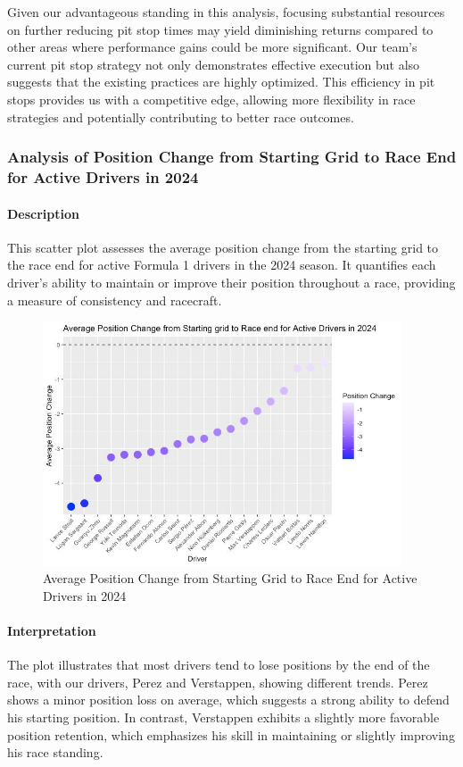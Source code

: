 \documentclass{article}
\begin{document}
Given our advantageous standing in this analysis, focusing substantial resources on further reducing pit stop times may yield diminishing returns compared to other areas where performance gains could be more significant. Our team's current pit stop strategy not only demonstrates effective execution but also suggests that the existing practices are highly optimized. This efficiency in pit stops provides us with a competitive edge, allowing more flexibility in race strategies and potentially contributing to better race outcomes.

\subsubsection{Analysis of Position Change from Starting Grid to Race End for Active Drivers in 2024}

\paragraph{Description}
This scatter plot assesses the average position change from the starting grid to the race end for active Formula 1 drivers in the 2024 season. It quantifies each driver's ability to maintain or improve their position throughout a race, providing a measure of consistency and racecraft.

\begin{figure}[H]
    \centering
    \includegraphics[width=0.95\textwidth]{images/querie/gridVSend.jpeg}
    \caption{Average Position Change from Starting Grid to Race End for Active Drivers in 2024}
\end{figure}

\paragraph{Interpretation}
The plot illustrates that most drivers tend to lose positions by the end of the race, with our drivers, Perez and Verstappen, showing different trends. Perez shows a minor position loss on average, which suggests a strong ability to defend his starting position. In contrast, Verstappen exhibits a slightly more favorable position retention, which emphasizes his skill in maintaining or slightly improving his race standing.
\end{document}
